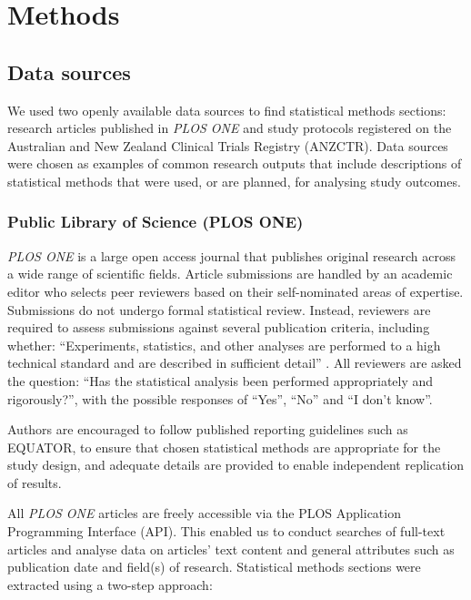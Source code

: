 \documentclass[12pt]{article}
\begin{document}
\hypertarget{methods}{%
\section{Methods}\label{methods}}

\subsection{Data sources}

We used two openly available data sources to find statistical methods
sections: research articles published in \emph{PLOS ONE} and study
protocols registered on the Australian and New Zealand Clinical Trials
Registry (ANZCTR). Data sources were chosen as examples of common
research outputs that include descriptions of statistical methods that
were used, or are planned, for analysing study outcomes.

\subsubsection{Public Library of Science (PLOS ONE)}
\label{sec:methodsPLOS}

\emph{PLOS ONE} is a large open access journal that publishes original
research across a wide range of scientific fields. Article submissions
are handled by an academic editor who selects peer reviewers based on
their self-nominated areas of expertise. Submissions do not undergo
formal statistical review. Instead, reviewers are required to assess
submissions against several publication criteria, including whether:
``Experiments, statistics, and other analyses are performed to a high
technical standard and are described in sufficient detail''
\citep{PLOS}. All reviewers are asked the question: ``Has the
statistical analysis been performed appropriately and rigorously?'',
with the possible responses of ``Yes'', ``No'' and ``I don't know''.

Authors are encouraged to follow published reporting guidelines such as
EQUATOR, to ensure that chosen statistical methods are appropriate for
the study design, and adequate details are provided to enable
independent replication of results.

All \emph{PLOS ONE} articles are freely accessible via the PLOS
Application Programming Interface (API). This enabled us to conduct
searches of full-text articles and analyse data on articles' text
content and general attributes such as publication date and field(s) of
research. Statistical methods sections were extracted using a two-step
approach:
\end{document}
